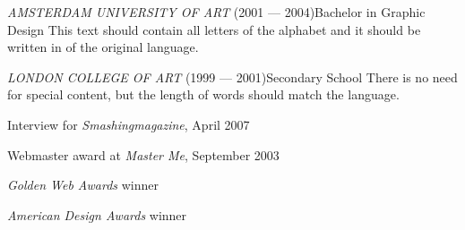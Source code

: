 \documentclass[a4paper, 12pt]{classycv}
\begin{document}
\begin{Resume}[%
    left background color=accent-color%
    , left foreground color=white%
    , left header color=white%
    , delimiter color=white%
    , delimiter width=0pt%
]
    \begin{Entry}[skip above=0pt]{\textit{\MakeUppercase{Amsterdam University of Art}} (2001 --- 2004)}{Bachelor in Graphic Design}%
        This text should contain all letters of the alphabet and it should be written in of the original language.%
    \end{Entry}%
    \begin{Entry}[skip above=0pt]{\textit{\MakeUppercase{London College of Art}} (1999 --- 2001)}{Secondary School}%
        There is no need for special content, but the length of words should match the language.%
    \end{Entry}%
    \begin{List}[skip above=0pt, skip below=0pt]
        \item Interview for \textit{Smashingmagazine}, April 2007%
        \item Webmaster award at \textit{Master Me}, September 2003%
        \item \textit{Golden Web Awards} winner%
        \item \textit{American Design Awards} winner%
    \end{List}%
\end{Resume}
    
\end{document}
